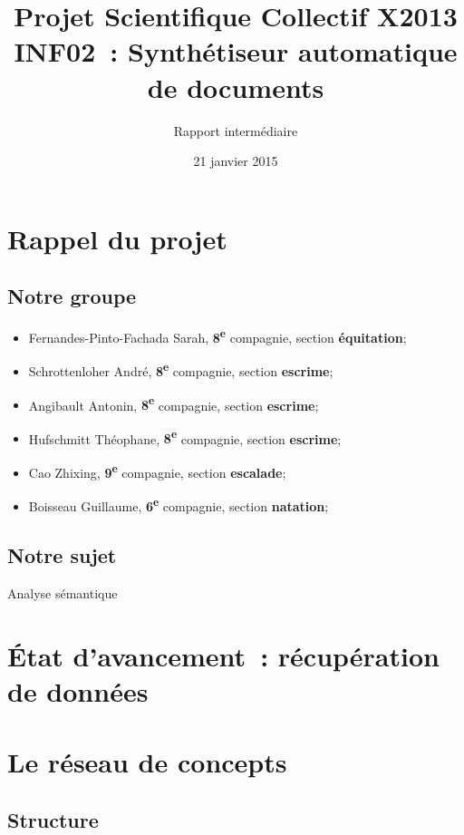 \documentclass{article}           %
\title{Projet Scientifique Collectif X2013 \\INF02~: Synthétiseur automatique de documents}     %
\author{Rapport intermédiaire}
\date{21 janvier 2015}
\begin{document}

\maketitle  

\newpage

\tableofcontents			
\newpage

\section{Rappel du projet}

\subsection{Notre groupe}
\begin{itemize}
 \item Fernandes-Pinto-Fachada Sarah, \textbf{8\textsuperscript{e}} compagnie, section \textbf{\'equitation};
 \item Schrottenloher Andr\'e, \textbf{8\textsuperscript{e}} compagnie, section \textbf{escrime};
 \item Angibault Antonin, \textbf{8\textsuperscript{e}} compagnie, section \textbf{escrime};
 \item Hufschmitt Th\'eophane, \textbf{8\textsuperscript{e}} compagnie, section \textbf{escrime};
 \item Cao Zhixing, \textbf{9\textsuperscript{e}} compagnie, section \textbf{escalade};
 \item Boisseau Guillaume, \textbf{6\textsuperscript{e}} compagnie, section \textbf{natation};
\end{itemize}

\subsection{Notre sujet}
Analyse s\'emantique

\section{\'Etat d'avancement~: r\'ecup\'eration de donn\'ees}

\section{Le r\'eseau de concepts}


\subsection{Structure}
\end{document}
